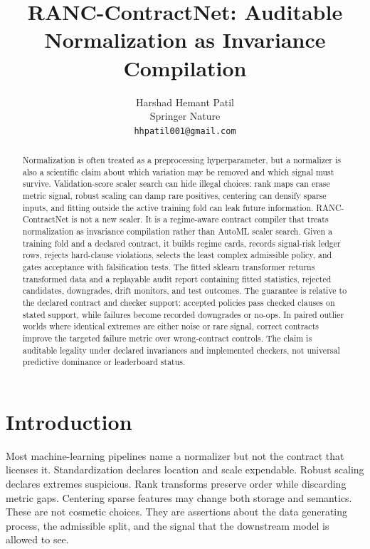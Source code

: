 \documentclass{article}
\title{RANC-ContractNet: Auditable Normalization as Invariance Compilation}
\author{
  Harshad Hemant Patil \\
  Springer Nature \\
  \texttt{hhpatil001@gmail.com}
}
\begin{document}
\maketitle

\begin{abstract}
Normalization is often treated as a preprocessing hyperparameter, but a
normalizer is also a scientific claim about which variation may be removed and
which signal must survive. Validation-score scaler search can hide illegal
choices: rank maps can erase metric signal, robust scaling can damp rare
positives, centering can densify sparse inputs, and fitting outside the active
training fold can leak future information. RANC-ContractNet is not a new
scaler. It is a regime-aware contract compiler that treats normalization as
invariance compilation rather than AutoML scaler search. Given a training fold
and a declared contract, it builds regime cards, records signal-risk ledger
rows, rejects hard-clause violations, selects the least complex admissible
policy, and gates acceptance with falsification tests. The fitted sklearn
transformer returns transformed data and a replayable audit report containing
fitted statistics, rejected candidates, downgrades, drift monitors, and test
outcomes. The guarantee is relative to the declared contract and checker
support: accepted policies pass checked clauses on stated support, while
failures become recorded downgrades or no-ops. In paired outlier worlds where
identical extremes are either noise or rare signal, correct contracts improve
the targeted failure metric over wrong-contract controls. The claim is auditable
legality under declared invariances and implemented checkers, not universal
predictive dominance or leaderboard status.
\end{abstract}

\section{Introduction}

Most machine-learning pipelines name a normalizer but not the contract that
licenses it. Standardization declares location and scale expendable. Robust
scaling declares extremes suspicious. Rank transforms preserve order while
discarding metric gaps. Centering sparse features may change both storage and
semantics. These are not cosmetic choices. They are assertions about the data
generating process, the admissible split, and the signal that the downstream
model is allowed to see.
\end{document}
